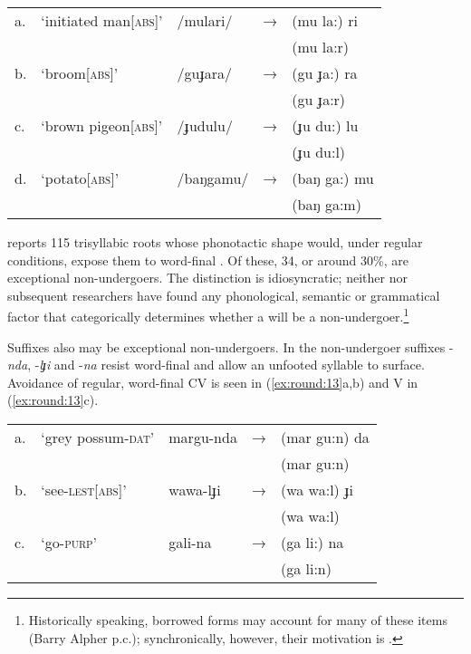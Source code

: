 \documentclass[output=paper,
modfonts
]{LSP/langsci}
\begin{document}
\ea \label{ex:round:12}\begin{tabular}[t]{@{}lllll}
a. & ‘initiated man[\textsc{abs}]’ & /mulari/ & → & (mu la:) ri \\
&&&& \ljudge{*}(mu la:r) \\
b. & ‘broom[\textsc{abs}]’ & /guɟara/ & → & (gu ɟa:) ra \\
&&&& \ljudge{*}(gu ɟa:r) \\
c. & ‘brown pigeon[\textsc{abs}]’ &  /ɟudulu/ & → & (ɟu du:) lu \\
&&&& \ljudge{*}(ɟu du:l)\\
d. & ‘potato[\textsc{abs}]’ & /baŋgamu/ & → & (baŋ ga:) mu \\
&&&& \ljudge{*}(baŋ ga:m)\\
\end{tabular}
\z

\noindent \citet[59]{dixon1977a} reports 115 trisyllabic roots whose phonotactic shape would, under regular conditions, expose them to word-final . Of these, 34, or around 30\%, are exceptional non-undergoers. The distinction is idiosyncratic; neither \citet[58]{dixon1977a} nor subsequent researchers have found any phonological, semantic or grammatical factor that categorically determines whether a  will be a non-undergoer.\footnote{Historically speaking, borrowed forms may account for many of these items (Barry Alpher p.c.); synchronically, however, their motivation is .}

Suffixes also may be exceptional non-undergoers. In  the non-undergoer suffixes -\textit{nda}, -\textit{lɟi} and -\textit{na} resist word-final  and allow an unfooted syllable to surface. Avoidance of regular, word-final CV  is seen in (\ref{ex:round:13}a,b) and V  in (\ref{ex:round:13}c).

\ea \label{ex:round:13}\begin{tabular}[t]{@{}lllll}
a. &`grey possum\textsc{-dat}' & margu-nda  & → &  (mar gu:n) da \\
&&&& \ljudge{*}(mar gu:n) \\
b. &`see-\textsc{lest[abs]}' & wawa-lɟi & → & (wa wa:l) ɟi \\
&&&& \ljudge{*}(wa wa:l) \\
c. &`go-\textsc{purp}' & gali-na & → & (ga li:) na \\
&&&& \ljudge{*}(ga li:n) \\
\end{tabular}
\z
\end{document}
